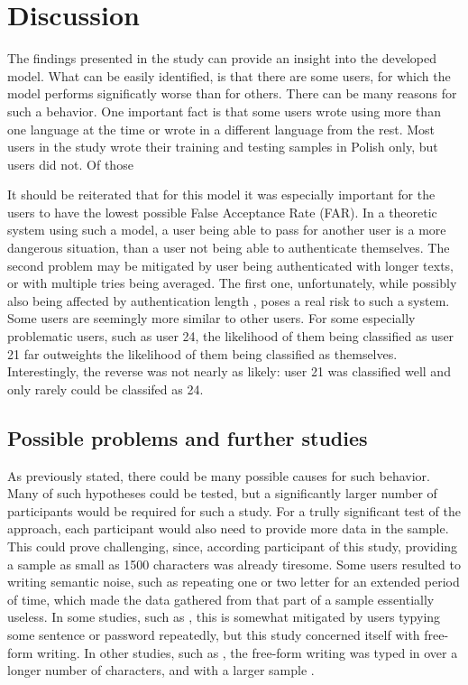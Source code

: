 
\section{Discussion}
The findings presented in the study can provide an insight into the developed model. What can be easily identified, is that there are some users, for which the model performs significatly worse than for others. There can be many reasons for such a behavior. One important fact is that some users wrote using more than one language at the time or wrote in a different language from the rest. Most users in the study wrote their training and testing samples in Polish only, but users  did not. Of those 

It should be reiterated that for this model it was especially important for the users to have the lowest possible False Acceptance Rate (FAR). In a theoretic system using such a model, a user being able to pass for another user is a more dangerous situation, than a user not being able to authenticate themselves. The second problem may be mitigated by user being authenticated with longer texts, or with multiple tries being averaged. The first one, unfortunately, while possibly also being affected by authentication length , poses a real risk to such a system. Some users are seemingly more similar to other users. For some especially problematic users, such as user 24, the likelihood of them being classified as user 21 far outweights the likelihood of them being classified as themselves. Interestingly, the reverse was not nearly as likely: user 21 was classified well and only rarely could be classifed as 24. 

\subsection{Possible problems and further studies}
As previously stated, there could be many possible causes for such behavior. Many of such hypotheses could be tested, but a significantly larger number of participants would be required for such a study. For a trully significant test of the approach, each participant would also need to provide more data in the sample. This could prove challenging, since, according participant of this study, providing a sample as small as 1500 characters was already tiresome. Some users resulted to writing semantic noise, such as repeating one or two letter for an extended period of time, which made the data gathered from that part of a sample essentially useless. In some studies, such as , this is somewhat mitigated by users typying some sentence or password repeatedly, but this study concerned itself with free-form writing. In other studies, such as , the free-form writing was typed in over a longer number of characters, and with a larger sample .

